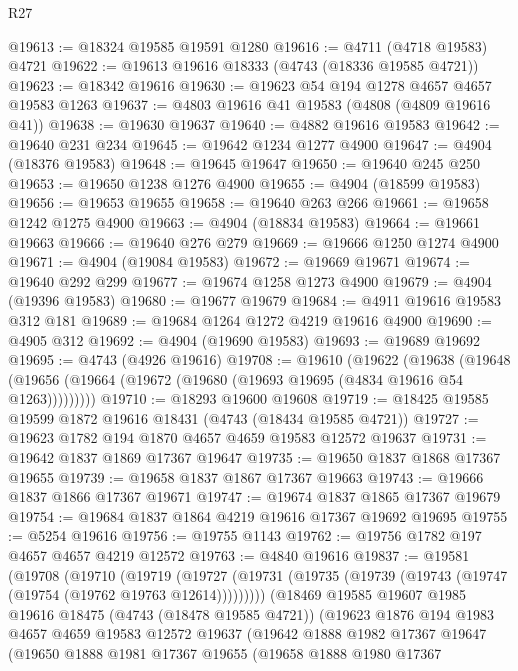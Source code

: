 \begin{lexlean}{R27}
\begin{coremodule}
@19613 := @18324 @19585 @19591 @1280
@19616 := @4711 (@4718 @19583) @4721
@19622 := @19613 @19616 @18333 (@4743 (@18336 @19585 @4721))
@19623 := @18342 @19616
@19630 := @19623 @54 @194 @1278 @4657 @4657 @19583 @1263
@19637 := @4803 @19616 @41 @19583 (@4808 (@4809 @19616 @41))
@19638 := @19630 @19637
@19640 := @4882 @19616 @19583
@19642 := @19640 @231 @234
@19645 := @19642 @1234 @1277 @4900
@19647 := @4904 (@18376 @19583)
@19648 := @19645 @19647
@19650 := @19640 @245 @250
@19653 := @19650 @1238 @1276 @4900
@19655 := @4904 (@18599 @19583)
@19656 := @19653 @19655
@19658 := @19640 @263 @266
@19661 := @19658 @1242 @1275 @4900
@19663 := @4904 (@18834 @19583)
@19664 := @19661 @19663
@19666 := @19640 @276 @279
@19669 := @19666 @1250 @1274 @4900
@19671 := @4904 (@19084 @19583)
@19672 := @19669 @19671
@19674 := @19640 @292 @299
@19677 := @19674 @1258 @1273 @4900
@19679 := @4904 (@19396 @19583)
@19680 := @19677 @19679
@19684 := @4911 @19616 @19583 @312 @181
@19689 := @19684 @1264 @1272 @4219 @19616 @4900
@19690 := @4905 @312
@19692 := @4904 (@19690 @19583)
@19693 := @19689 @19692
@19695 := @4743 (@4926 @19616)
@19708 := @19610
    (@19622
      (@19638
        (@19648 (@19656 (@19664 (@19672 (@19680 (@19693 @19695 (@4834 @19616 @54 @1263)))))))))
@19710 := @18293 @19600 @19608
@19719 := @18425 @19585 @19599 @1872 @19616 @18431 (@4743 (@18434 @19585 @4721))
@19727 := @19623 @1782 @194 @1870 @4657 @4659 @19583 @12572 @19637
@19731 := @19642 @1837 @1869 @17367 @19647
@19735 := @19650 @1837 @1868 @17367 @19655
@19739 := @19658 @1837 @1867 @17367 @19663
@19743 := @19666 @1837 @1866 @17367 @19671
@19747 := @19674 @1837 @1865 @17367 @19679
@19754 := @19684 @1837 @1864 @4219 @19616 @17367 @19692 @19695
@19755 := @5254 @19616
@19756 := @19755 @1143
@19762 := @19756 @1782 @197 @4657 @4657 @4219 @12572
@19763 := @4840 @19616
@19837 := @19581
    (@19708
      (@19710
        (@19719
          (@19727 (@19731 (@19735 (@19739 (@19743 (@19747 (@19754 (@19762 @19763 @12614)))))))))
        (@18469
          @19585
          @19607
          @1985
          @19616
          @18475
          (@4743 (@18478 @19585 @4721))
          (@19623
            @1876
            @194
            @1983
            @4657
            @4659
            @19583
            @12572
            @19637
            (@19642
              @1888
              @1982
              @17367
              @19647
              (@19650
                @1888
                @1981
                @17367
                @19655
                (@19658
                  @1888
                  @1980
                  @17367

\end{coremodule}
\end{lexlean}
